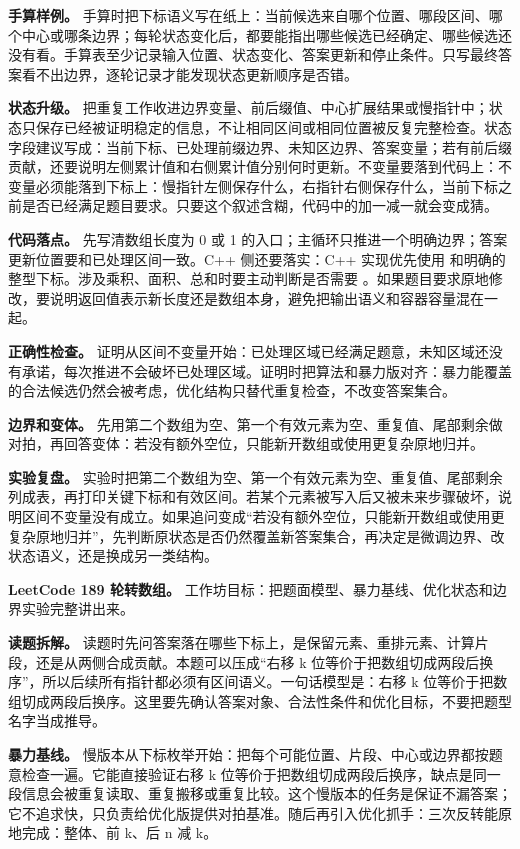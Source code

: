 \textbf{手算样例。} 手算时把下标语义写在纸上：当前候选来自哪个位置、哪段区间、哪个中心或哪条边界；每轮状态变化后，都要能指出哪些候选已经确定、哪些候选还没有看。手算表至少记录输入位置、状态变化、答案更新和停止条件。只写最终答案看不出边界，逐轮记录才能发现状态更新顺序是否错。

\textbf{状态升级。} 把重复工作收进边界变量、前后缀值、中心扩展结果或慢指针中；状态只保存已经被证明稳定的信息，不让相同区间或相同位置被反复完整检查。状态字段建议写成：当前下标、已处理前缀边界、未知区边界、答案变量；若有前后缀贡献，还要说明左侧累计值和右侧累计值分别何时更新。不变量要落到代码上：不变量必须能落到下标上：慢指针左侧保存什么，右指针右侧保存什么，当前下标之前是否已经满足题目要求。只要这个叙述含糊，代码中的加一减一就会变成猜。

\textbf{代码落点。} 先写清数组长度为 0 或 1 的入口；主循环只推进一个明确边界；答案更新位置要和已处理区间一致。C++ 侧还要落实：C++ 实现优先使用  和明确的整型下标。涉及乘积、面积、总和时要主动判断是否需要 。如果题目要求原地修改，要说明返回值表示新长度还是数组本身，避免把输出语义和容器容量混在一起。

\textbf{正确性检查。} 证明从区间不变量开始：已处理区域已经满足题意，未知区域还没有承诺，每次推进不会破坏已处理区域。证明时把算法和暴力版对齐：暴力能覆盖的合法候选仍然会被考虑，优化结构只替代重复检查，不改变答案集合。

\textbf{边界和变体。} 先用第二个数组为空、第一个有效元素为空、重复值、尾部剩余做对拍，再回答变体：若没有额外空位，只能新开数组或使用更复杂原地归并。

\textbf{实验复盘。} 实验时把第二个数组为空、第一个有效元素为空、重复值、尾部剩余列成表，再打印关键下标和有效区间。若某个元素被写入后又被未来步骤破坏，说明区间不变量没有成立。如果追问变成“若没有额外空位，只能新开数组或使用更复杂原地归并”，先判断原状态是否仍然覆盖新答案集合，再决定是微调边界、改状态语义，还是换成另一类结构。

\noindent\textbf{LeetCode 189 轮转数组。} 工作坊目标：把题面模型、暴力基线、优化状态和边界实验完整讲出来。

\textbf{读题拆解。} 读题时先问答案落在哪些下标上，是保留元素、重排元素、计算片段，还是从两侧合成贡献。本题可以压成“右移 k 位等价于把数组切成两段后换序”，所以后续所有指针都必须有区间语义。一句话模型是：右移 k 位等价于把数组切成两段后换序。这里要先确认答案对象、合法性条件和优化目标，不要把题型名字当成推导。

\textbf{暴力基线。} 慢版本从下标枚举开始：把每个可能位置、片段、中心或边界都按题意检查一遍。它能直接验证右移 k 位等价于把数组切成两段后换序，缺点是同一段信息会被重复读取、重复搬移或重复比较。这个慢版本的任务是保证不漏答案；它不追求快，只负责给优化版提供对拍基准。随后再引入优化抓手：三次反转能原地完成：整体、前 k、后 n 减 k。

